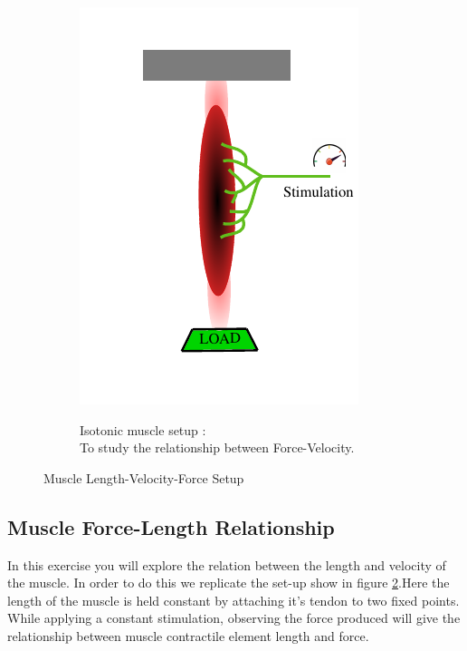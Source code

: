 \documentclass{cmc}
\begin{document}
\begin{figure}[H]
\begin{subfigure}[b]{0.49\textwidth}
{      \includegraphics[width=\textwidth]{figures/isotonic_muscle}
      \label{fig:isotonic_muscle}
    }
    \caption{Isotonic muscle setup :\\ To study the relationship
      between Force-Velocity.}
  \end{subfigure}
  \caption{Muscle Length-Velocity-Force Setup}
  \label{fig:muscle-setup}
\end{figure}

\subsection*{Muscle Force-Length Relationship}
\label{sec:muscle-force-length}
In this exercise you will explore the relation between the length and
velocity of the muscle. In order to do this we replicate the set-up
show in figure \ref{fig:muscle-setup}.Here the length of the muscle is
held constant by attaching it's tendon to two fixed points. While
applying a constant stimulation, observing the force produced will
give the relationship between muscle contractile element length and
force.
\end{document}
